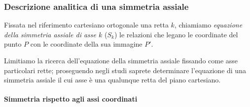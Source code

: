 \subsubsection{\textbf{Descrizione analitica di una simmetria assiale}}

\begin{definizione}
  Fissata nel riferimento cartesiano ortogonale una retta $k$, 
  chiamiamo \emph{equazione della simmetria assiale di asse $k$} ($S_k$) 
  le relazioni che legano le coordinate del punto $P$ con le coordinate 
  della sua immagine $P'$.
\end{definizione}

Limitiamo la ricerca dell'equazione della simmetria assiale fissando 
come asse particolari rette; proseguendo negli studi saprete 
determinare l'equazione di una simmetria assiale il cui asse è una 
qualunque retta del piano cartesiano.

\paragraph{Simmetria rispetto agli assi coordinati}
~

